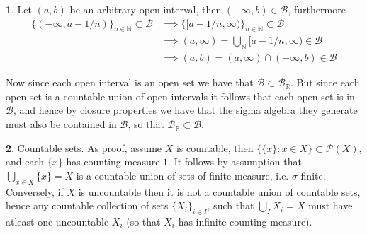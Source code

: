 \documentclass[11pt]{article}
\theoremstyle{definition}
\newtheorem{pb}{}
\newcommand{\set}[1]{\{#1\}}
\begin{document}
	\begin{pb}
		Let \((a,b)\) be an arbitrary open interval, then \((-\infty,b) \in \mathcal{B}\), furthermore
		\begin{align*}
			\set{(-\infty, a - 1/n)}_{n \in \mathbb{N}} \subset \mathcal{B} &\implies \set{[a - 1/n, \infty)}_{n \in \mathbb{N}} \subset \mathcal{B} \\
			&\implies (a,\infty) = \bigcup_{\mathbb{N}} [a-1/n,\infty) \in \mathcal{B} \\
			&\implies (a,b) = (a,\infty) \cap (-\infty, b) \in \mathcal{B}
		\end{align*}

		Now since each open interval is an open set we have that \(\mathcal{B} \subset \mathcal{B}_\mathbb{R}\). But since each open set is a countable union
		of open intervals it follows that each open set is in \(\mathcal{B}\), and hence by closure properties we have that
		the sigma algebra they generate must also be contained in \(\mathcal{B}\), so that \(\mathcal{B}_\mathbb{R} \subset \mathcal{B}\).
	\end{pb}

	\begin{pb}
		Countable sets. As proof, assume \(X\) is countable, then \(\set{\set{x}: x \in X} \subset \mathcal{P}(X)\), and each \(\set{x}\) has counting measure \(1\).
		It follows by assumption that \(\bigcup_{x\in X}\set{x} = X\) is a countable union of sets of finite measure, i.e. \(\sigma\)-finite.
		Conversely, if \(X\) is uncountable then it is not a countable union of countable sets, hence any countable collection of sets
		\(\set{X_i}_{i \in I}\), such that \(\bigcup_I X_i = X\) must have atleast one uncountable \(X_i\) (so that \(X_i\) has infinite counting measure).
	\end{pb}
\end{document}
